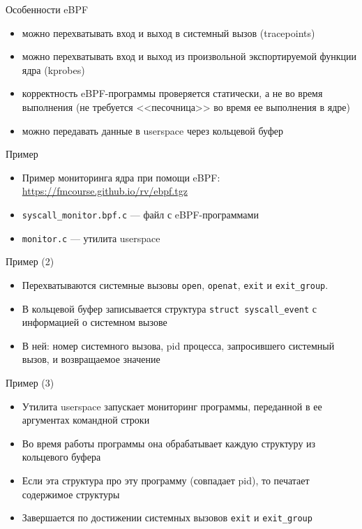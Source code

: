 \documentclass[hyperref={unicode=true}]{beamer}
\begin{document}
    \begin{frame}{Особенности eBPF}
    \begin{itemize}
    \item можно перехватывать вход и выход в системный вызов
    (tracepoints)
    \item можно перехватывать вход и выход из произвольной экспортируемой
    функции ядра (kprobes)
    \item корректность eBPF-программы проверяется статически,
    а не во время выполнения (не требуется <<песочница>> во время
    ее выполнения в ядре)
    \item можно передавать данные в userspace через кольцевой буфер
    \end{itemize}
    \end{frame}

    \begin{frame}{Пример}
    \begin{itemize}
    \item Пример мониторинга ядра при помощи eBPF:
    \url{https://fmcourse.github.io/rv/ebpf.tgz}
    \item \texttt{syscall\_monitor.bpf.c} --- файл с eBPF-программами
    \item \texttt{monitor.c} --- утилита userspace
    \end{itemize}
    \end{frame}

    \begin{frame}{Пример (2)}
    \begin{itemize}
    \item Перехватываются системные вызовы
    \texttt{open}, \texttt{openat}, \texttt{exit}
    и \texttt{exit\_group}.
    \item В кольцевой буфер записывается структура
    \texttt{struct syscall\_event} с информацией о
    системном вызове
    \item В ней: номер системного вызова,
    pid процесса, запросившего системный вызов,
    и возвращаемое значение
    \end{itemize}
    \end{frame}

    \begin{frame}{Пример (3)}
    \begin{itemize}
    \item Утилита userspace запускает мониторинг
    программы, переданной в ее аргументах командной строки
    \item Во время работы программы она обрабатывает каждую
    структуру из кольцевого буфера
    \item Если эта структура про эту программу (совпадает pid),
    то печатает содержимое структуры
    \item Завершается по достижении системных вызовов
    \texttt{exit} и \texttt{exit\_group}
    \end{itemize}
    \end{frame}
\end{document}
